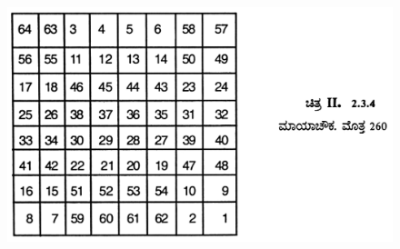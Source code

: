 \begin{figure}[H]
\includegraphics[scale=.85]{src/figures/chap3/fig3.27.jpg}
\end{figure}

\newpage

